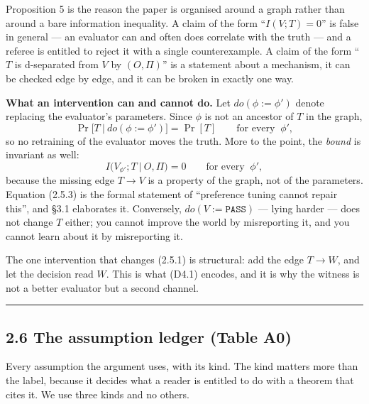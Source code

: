\documentclass[11pt,a4paper]{article}
\begin{document}
Proposition 5 is the reason the paper is organised around a graph rather than
around a bare information inequality. A claim of the form ``\(I(V;T)=0\)'' is
false in general --- an evaluator can and often does correlate with the truth --- and
a referee is entitled to reject it with a single counterexample. A claim of the
form ``\(T\) is d-separated from \(V\) by \((O,\Pi)\)'' is a statement about a mechanism,
it can be checked edge by edge, and it can be broken in exactly one way.

\textbf{What an intervention can and cannot do.} Let \(do(\phi:=\phi')\) denote
replacing the evaluator's parameters. Since \(\phi\) is not an ancestor of \(T\) in
the graph,
\begin{equation}
\Pr\big[T\ \big|\ do(\phi:=\phi')\big]=\Pr[T]
\qquad\text{for every }\ \phi',
\tag{2.5.2}
\end{equation}
so no retraining of the evaluator moves the truth. More to the point, the \emph{bound}
is invariant as well:
\begin{equation}
I\big(V_{\phi'};T\ \big|\ O,\Pi\big)=0
\qquad\text{for every }\ \phi',
\tag{2.5.3}
\end{equation}
because the missing edge \(T\to V\) is a property of the graph, not of the
parameters. Equation (2.5.3) is the formal statement of ``preference tuning cannot
repair this'', and §3.1 elaborates it. Conversely, \(do(V:=\texttt{PASS})\) --- lying
harder --- does not change \(T\) either; you cannot improve the world by misreporting
it, and you cannot learn about it by misreporting it.

The one intervention that changes (2.5.1) is structural: add the edge \(T\to W\),
and let the decision read \(W\). This is what (D4.1) encodes, and it is why the
witness is not a better evaluator but a second channel.

\begin{center}\rule{0.5\linewidth}{0.5pt}\end{center}

\subsection{2.6 The assumption ledger (Table A0)}\label{the-assumption-ledger-table-a0}

Every assumption the argument uses, with its kind. The kind matters more than the
label, because it decides what a reader is entitled to do with a theorem that
cites it. We use three kinds and no others.
\end{document}
